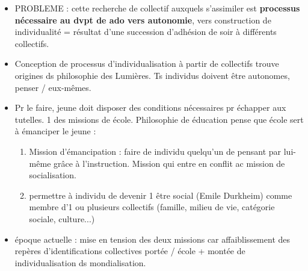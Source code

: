 \documentclass[12pt]{article}
\begin{document}
\begin{itemize}
\item PROBLEME : cette recherche de collectif auxquels s'assimiler est \textbf{processus nécessaire au dvpt de ado vers autonomie}, vers construction de individualité = résultat d'une succession d'adhésion de soir à différents collectifs.\\

\item Conception de processus d'individualisation à partir de collectifs trouve origines ds philosophie des Lumières. Ts individus doivent être autonomes, penser / eux-mêmes.

\vspace{0.5cm}


\vspace{0.5cm}

\item Pr le faire, jeune doit disposer des conditions nécessaires pr échapper aux tutelles. 1 des missions de école. Philosophie de éducation pense que école sert à émanciper le jeune : 
\begin{enumerate}
\item Mission d'émancipation : faire de individu quelqu'un de pensant par lui-même grâce à l'instruction. Mission qui entre en conflit ac mission de socialisation. \\
\item permettre à individu de devenir 1 être social (Emile Durkheim) comme membre d'1 ou plusieurs collectifs (famille, milieu de vie, catégorie sociale, culture...)
\end{enumerate}

\item époque actuelle : mise en tension des deux missions car affaiblissement des repères d'identifications collectives portée / école + montée de individualisation ds mondialisation.\\


\end{itemize}
\end{document}
